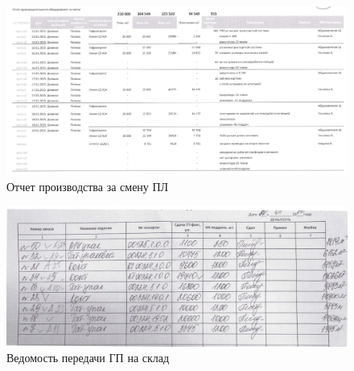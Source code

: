 \begin{figure}
\begin{center}
 \includegraphics[width=\linewidth, height=0.94\textheight, keepaspectratio]{Pics/f25.jpg}
\end{center}
\caption{Отчет производства за смену ПЛ}
\label{pic:f25}
\end{figure}

\begin{figure}
\begin{center}
 \includegraphics[width=\linewidth, height=0.94\textheight, keepaspectratio]{Pics/f6.jpg}
\end{center}
\caption{Ведомость передачи ГП на склад}
\label{pic:f6}
\end{figure}

\clearpage